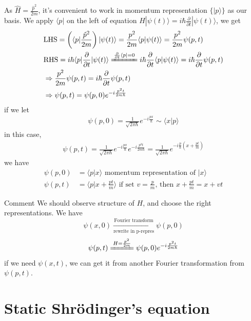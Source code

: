 \documentclass[UTF8,12pt]{article} %
\numberwithin{equation}{section}
\begin{document}
As $\hat{H} = \frac{\hat{p}^{2}}{2m}$, it's convenient to work in momentum representation $\{|p\rangle\}$ as our basis. We apply $\langle p|$ on the left of equation $H|\psi(t)\rangle = i\hbar\frac{\partial}{\partial t}|\psi(t)\rangle$, we get
\begin{align}
&\text{LHS} = \left(\langle p|\frac{\hat{p}^{2}}{2m}\right)|\psi(t)\rangle = \frac{p^{2}}{2m} \langle p|\psi(t)\rangle = \frac{p^{2}}{2m} \psi(p,t) \\
&\text{RHS} = i\hbar\langle p|\frac{\partial}{\partial t}|\psi(t)\rangle \xlongequal{\frac{\partial}{\partial t}\langle p| = 0} i\hbar\frac{\partial}{\partial t}\langle p|\psi(t)\rangle = i\hbar\frac{\partial}{\partial t}\psi(p,t) \\
&\Rightarrow \frac{p^{2}}{2m}\psi(p,t) = i\hbar\frac{\partial}{\partial t}\psi(p,t) \\
&\Rightarrow \psi(p,t) = \psi(p,0) e^{-i\frac{p^{2}t}{2m\hbar}}
\end{align}
if we let
\begin{align}
\psi(p,0) = \frac{1}{\sqrt{2\pi\hbar}} e^{-i\frac{px}{\hbar}} \sim \langle x|p\rangle
\end{align}
in this case, 
\begin{align}
\boxed{\psi(p,t) = \frac{1}{\sqrt{2\pi\hbar}} e^{-i\frac{px}{\hbar}} e^{-i\frac{p^{2}t}{2m\hbar}} = \frac{1}{\sqrt{2\pi\hbar}} e^{-i\frac{p}{\hbar}\left(x + \frac{pt}{m}\right)}}
\end{align}
we have
\begin{align}
\psi(p,0) &= \langle p|x\rangle \text{ momentum representation of } |x\rangle \\
\psi(p,t) &= \langle p|x + \frac{pt}{m}\rangle \text{ if set } v=\frac{p}{m} \text{, then } x+\frac{pt}{m} = x+vt
\end{align}

\begin{myboxes}{Comment}{}
We should observe structure of $H$, and choose the right representations. We have
$$\psi(x,0) \xrightarrow[\text{rewrite in p-repres}]{\text{Fourier transform}} \psi(p,0)$$
$$\psi(p,t) \xlongequal{H = \frac{p^{2}}{2m}} \psi(p,0) e^{-i\frac{p^{2}t}{2m\hbar}}$$
if we need $\psi(x,t)$, we can get it from another Fourier transformation from $\psi(p,t)$.
\end{myboxes}

\section{Static Shr\"{o}dinger's equation}
\end{document}
